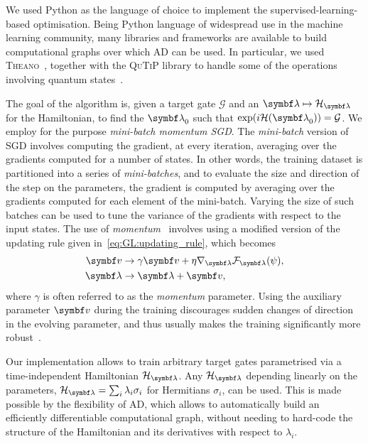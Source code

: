 We used Python as the language of choice to implement the supervised-learning-based optimisation.
Being Python language of widespread use in the machine learning community, many libraries and frameworks are available to build computational graphs over which \ac{AD} can be used.
In particular, we used \textsc{Theano}~\cite{team2016theano}, together with the \textsc{QuTiP} library to handle some of the operations involving quantum states~\cite{johansson2012qutip,johansson2013qutip}.

The goal of the algorithm is, given a target gate $\mathcal G$ and an \ansatz $\bslambda\mapsto\calH_\bslambda$ for the Hamiltonian, to find the $\bslambda_0$ such that $\exp(i\calH(\bslambda_0))=\calG$.
We employ for the purpose \emph{mini-batch momentum \ac{SGD}}.
The \emph{mini-batch} version of \ac{SGD} involves computing the gradient, at every iteration, averaging over the gradients computed for a number of states.
In other words, the training dataset is partitioned into a series of \emph{mini-batches}, and to evaluate the size and direction of the step on the parameters, the gradient is computed by averaging over the gradients computed for each element of the mini-batch.
Varying the size of such batches can be used to tune the variance of the gradients with respect to the input states.
The use of \emph{momentum}~\cite{ruder2016overview,goh2017momentum} involves using a modified version of the updating rule given in~\cref{eq:GL:updating_rule}, which becomes
\begin{equation}
\begin{aligned}
    \bs v &\to \gamma \bs v + \eta \grad_{\bslambda} \calF_\bslambda(\psi), \\
    \bslambda &\to \bslambda + \bs v,
\end{aligned}
\label{eq:GL:updating_rule_momentum}
\end{equation}
where $\gamma$ is often referred to as the \emph{momentum} parameter.
Using the auxiliary parameter $\bs v$ during the training discourages sudden changes of direction in the evolving parameter, and thus usually makes the training significantly more robust~\cite{goh2017momentum}.

Our implementation allows to train arbitrary target gates parametrised via a time-independent Hamiltonian $\calH_\bslambda$.
Any $\calH_\bslambda$ depending linearly on the parameters, $\calH_\bslambda=\sum_i \lambda_i \sigma_i$ for Hermitians $\sigma_i$, can be used.
This is made possible by the flexibility of \ac{AD}, which allows to automatically build an efficiently differentiable computational graph, without needing to hard-code the structure of the Hamiltonian and its derivatives with respect to $\lambda_i$.


